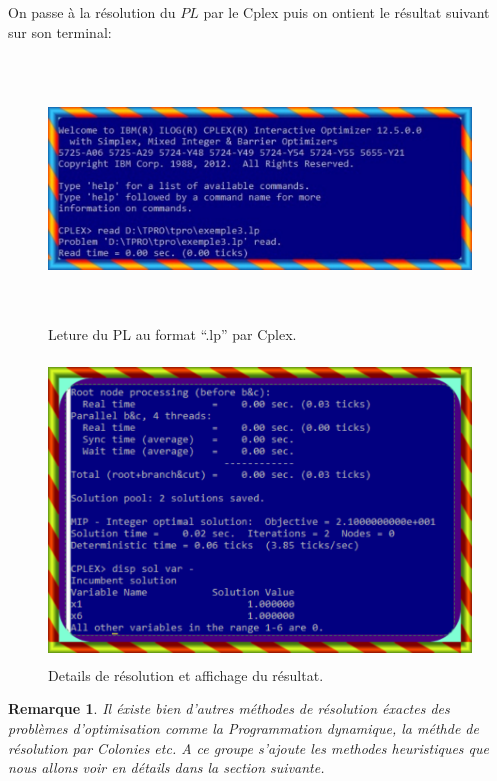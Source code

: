 \documentclass[a4paper,11pt,oneside]{report}
\newtheorem{remarque}{Remarque}[section]
\theoremstyle{plain}
\newcommand{\0}{/ \! \! \! 0}
\theoremstyle{plain}
\begin{document}
On passe \`a la r\'esolution du $PL$ par le Cplex puis on ontient le r\'esultat suivant sur son terminal:
  \begin{figure}[]
  \begin{center}
  \includegraphics[height=7cm,width=16cm]{tp1}
  \caption{\label{fig2}Leture du PL au format ``.lp'' par Cplex.}
  \end{center}
  \end{figure}
 \begin{figure}[]
  \begin{center}
  \includegraphics[height=8cm,width=15cm]{tp2}
  \caption{\label{fig2} Details de r\'esolution et affichage du r\'esultat.}
  \end{center}
  \end{figure}
\begin{remarque}
Il \'existe bien d'autres m\'ethodes de r\'esolution \'exactes des probl\`emes d'optimisation comme la Programmation dynamique, la m\'ethde 
de r\'esolution par Colonies etc. A ce groupe s'ajoute les methodes heuristiques que nous allons voir en d\'etails dans la section suivante.
\end{remarque}
\end{document}
